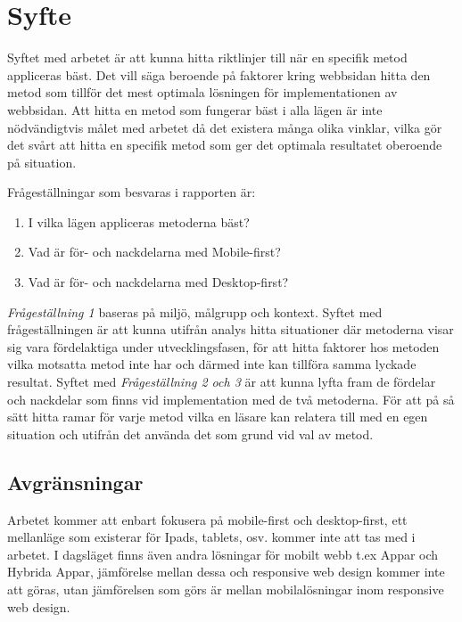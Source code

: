 \documentclass[11pt]{article}
\begin{document}
\newpage

\section{Syfte}
Syftet med arbetet är att kunna hitta riktlinjer till när en specifik metod appliceras bäst. Det vill säga beroende på faktorer kring webbsidan hitta den metod som tillför det mest optimala lösningen för implementationen av webbsidan. Att hitta en metod som fungerar bäst i alla lägen är inte nödvändigtvis målet med arbetet då det existera många olika vinklar, vilka gör det svårt att hitta en specifik metod som ger det optimala resultatet oberoende på situation.

\vspace{0.5cm}
Frågeställningar som besvaras i rapporten är:
\begin{enumerate}
	\item I vilka lägen appliceras metoderna bäst?
	\item Vad är för- och nackdelarna med Mobile-first?
	\item Vad är för- och nackdelarna med Desktop-first?
\end{enumerate}
\vspace{0.5cm}
\textit{Frågeställning 1} baseras på miljö, målgrupp och kontext. Syftet med frågeställningen är att kunna utifrån analys hitta situationer där metoderna visar sig vara fördelaktiga under utvecklingsfasen, för att hitta faktorer hos metoden vilka motsatta metod inte har och därmed inte kan tillföra samma lyckade resultat. Syftet med \textit{Frågeställning 2 och 3} är att kunna lyfta fram de fördelar och nackdelar som finns vid implementation med de två metoderna. För att på så sätt hitta ramar för varje metod vilka en läsare kan relatera till med en egen situation och utifrån det använda det som grund vid val av metod. 

\subsection{Avgränsningar}

Arbetet kommer att enbart fokusera på mobile-first och desktop-first, ett mellanläge som existerar för Ipads, tablets, osv. kommer inte att tas med i arbetet. I dagsläget finns även andra lösningar för mobilt webb t.ex Appar och Hybrida Appar, jämförelse mellan dessa och responsive web design kommer inte att göras, utan jämförelsen som görs är mellan mobilalösningar inom responsive web design.
\end{document}
